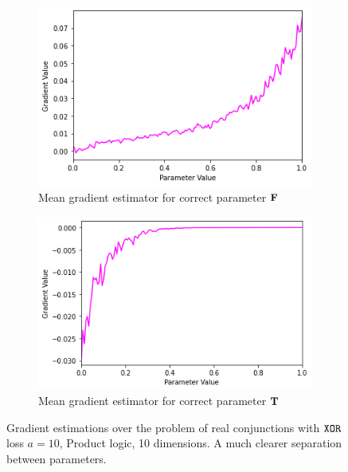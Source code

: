 \begin{figure}[h]
\begin{subfigure}[b]{0.47\textwidth}
        \includegraphics[width=\textwidth]{imgs/grad_prod_10_falseparam_avg.png}
        \caption{Mean gradient estimator for correct parameter $\textbf{F}$}
        \label{fig:conjgrad10falseavg}
    \end{subfigure}
    \begin{subfigure}[b]{0.47\textwidth}
        \centering
        \includegraphics[width=\textwidth]{imgs/grad_prod_10_trueparam_avg.png}
        \caption{Mean gradient estimator for correct parameter $\textbf{T}$}
        \label{fig:conjgrad10trueavg}
    \end{subfigure}
       \caption{Gradient estimations over the problem of real conjunctions with $\texttt{XOR}$ loss $a=10$, Product logic, 10 dimensions. A much clearer separation between parameters.}
       \label{fig:conjgrad10}
\end{figure}


